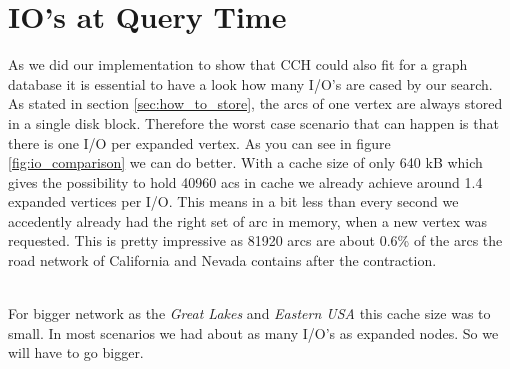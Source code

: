 

\section{IO's at Query Time}

As we did our implementation to show that CCH could also fit for a graph database it is essential to have a look how many I/O's are cased by our search. As stated in section \ref{sec:how_to_store}, the arcs of one vertex are always stored in a single disk block. Therefore the worst case scenario that can happen is that there is one I/O per expanded vertex.
As you can see in figure \ref{fig:io_comparison} we can do better. With a cache size of only 640 kB which gives the possibility to hold 40960 acs in cache we already achieve around 1.4 expanded vertices per I/O. This means in a bit less than every second we accedently already had the right set of arc in memory, when a new vertex was requested. This is pretty 
impressive as 81920 arcs are about 0.6\%  of the arcs the road network of California and Nevada contains after the contraction.

\\
For bigger network as the \textit{Great Lakes} and \textit{Eastern USA} this cache size was to small. In most scenarios we had about as many I/O's as  expanded nodes. So we will have to go bigger.




%


